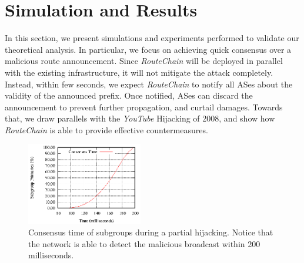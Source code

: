\documentclass[5p]{elsarticle}
\newcommand{\rc}{{{\em RouteChain}}\xspace}
\begin{document}

\section{Simulation and Results}\label{sec:simulation}
In this section, we present simulations and experiments performed to validate our theoretical analysis. In particular, we focus on achieving quick consensus over a malicious route announcement. Since \rc will be deployed in parallel with the existing infrastructure, it will not mitigate the attack completely. Instead, within few seconds, we expect \rc to notify all ASes about the validity of the announced prefix. Once notified, ASes can discard the announcement to prevent further propagation, and curtail damages. Towards that, we draw parallels with the {\em YouTube} Hijacking of 2008, and show how \rc is able to provide effective countermeasures.  

\begin{figure}[t]
\begin{center}
\includegraphics[width=0.45\textwidth]{fig/partialHijackR2.eps}
\caption{Consensus time of subgroups during a partial hijacking. Notice that the network is able to detect the malicious broadcast within 200 milliseconds. } 
\label{fig:simPartial}
\end{center}
\end{figure}
\end{document}
